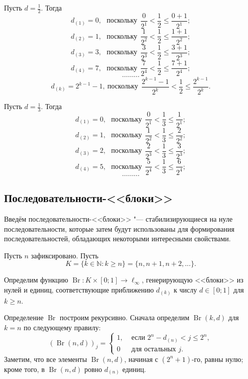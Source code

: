 \begin{example}
	Пусть $d=\frac12$.
	Тогда
	$$
		d_{(1)} = 0, ~~~\mbox{поскольку}~~ \frac{0}{2^1} < \frac12 \leq \frac{0+1}{2^1};
	$$
	$$
		d_{(2)} = 1, ~~~\mbox{поскольку}~~ \frac{1}{2^2} < \frac12 \leq \frac{1+1}{2^2};
	$$
	$$
		d_{(3)} = 3, ~~~\mbox{поскольку}~~ \frac{3}{2^3} < \frac12 \leq \frac{3+1}{2^3};
	$$
	$$
		d_{(4)} = 7, ~~~\mbox{поскольку}~~ \frac{7}{2^4} < \frac12 \leq \frac{7+1}{2^4};
	$$
	$$
		\dots\dots\dots
	$$
	$$
		d_{(k)} = 2^{k-1}-1, ~\mbox{поскольку}~~ \frac{2^{k-1}-1}{2^k} < \frac12 \leq \frac{2^{k-1}}{2^k}.
	$$
\end{example}

\begin{example}
	Пусть $d=\frac13$.
	Тогда
	$$
		d_{(1)} = 0, ~~~\mbox{поскольку}~~ \frac{0}{2^1} < \frac13 \leq \frac{1}{2^1};
	$$
	$$
		d_{(2)} = 1, ~~~\mbox{поскольку}~~ \frac{1}{2^2} < \frac13 \leq \frac{2}{2^2};
	$$
	$$
		d_{(3)} = 2, ~~~\mbox{поскольку}~~ \frac{2}{2^3} < \frac13 \leq \frac{3}{2^3};
	$$
	$$
		d_{(4)} = 5, ~~~\mbox{поскольку}~~ \frac{5}{2^4} < \frac13 \leq \frac{6}{2^4};
	$$
	$$
		\dots\dots\dots
	$$
\end{example}


\subsection{Последовательности-<<блоки>>}

Введём последовательности-<<блоки>> "---
стабилизирующиеся на нуле последовательности,
которые затем будут использованы для формирования последовательностей,
обладающих некоторыми интересными свойствами.

Пусть $n$ зафиксировано.
Пусть
\begin{equation}
	K = \{k\in\mathbb{N} : k \geq n\} = \{n, n+1, n+2, ...\}
	.
\end{equation}


Определим функцию $\operatorname{Br}:K\times [0;1] \to \ell_\infty$,
генерирующую <<блоки>> из нулей и единиц,
соответствующие приближению $d_{(k)}$ к числу $d\in[0;1]$ для $k \geq n$.

Определение $\operatorname{Br}$ построим рекурсивно.
Сначала определим $\operatorname{Br}(k,d)$ для $k=n$ по следующему правилу:
\begin{equation}
	(\operatorname{Br}(n,d))_j = \begin{cases}
		1, & \mbox{~если~} 2^n - d_{(n)} < j \leq 2^n,
		\\
		0  & \mbox{~для остальных~} j
		.
	\end{cases}
\end{equation}
Заметим, что все элементы $\operatorname{Br}(n,d)$, начиная с $(2^n+1)$-го, равны нулю;
кроме того, в $\operatorname{Br}(n,d)$ ровно $d_{(n)}$ единиц.

